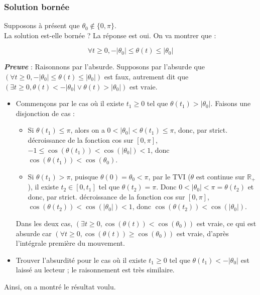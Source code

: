 \documentclass[9pt,a4paper]{article}
\begin{document}
\subsubsection{Solution bornée}
Supposons à présent que $\theta_0 \notin \{0, \pi\}$.\\
La solution est-elle bornée ? La réponse est oui. On va montrer que :
\begin{tcolorbox}[colback=green!5!white, colframe=green!50!black]
    $$
    \forall t \geq 0, -|\theta_0| \leq \theta(t) \leq |\theta_0|
    $$
\end{tcolorbox}
\textbf{\textit{Preuve}} : Raisonnons par l'absurde. Supposons par l'absurde que $(\forall t \geq 0, -|\theta_0| \leq \theta(t) \leq |\theta_0|)$ est faux, autrement dit que $(\exists t \geq 0, \theta(t) < -|\theta_0| \lor \theta(t) > |\theta_0|)$ est vraie.\\
\begin{itemize}[label=\textbullet]
    \item Commençons par le cas où il existe $t_1 \geq 0$ tel que $\theta(t_1) > |\theta_0|$. Faisons une disjonction de cas :
    \begin{itemize}[label=\textbullet]
        \item Si $\theta(t_1) \leq \pi$, alors on a $0 < |\theta_0| < \theta(t_1) \leq \pi$, donc, par strict. décroissance de la fonction cos sur $[0, \pi]$, $-1 \leq \cos(\theta(t_1)) < \cos(|\theta_0|) < 1$, donc $\cos(\theta(t_1)) < \cos(\theta_0)$.
        \item Si $\theta(t_1) > \pi$, puisque $\theta(0) = \theta_0 < \pi$, par le TVI ($\theta$ est continue sur $\mathbb{R}_+$), il existe $t_2 \in [0, t_1]$ tel que $\theta(t_2) = \pi$. Donc $0 < |\theta_0| < \pi = \theta(t_2)$ et donc, par strict. décroissance de la fonction cos sur $[0, \pi]$, $\cos(\theta(t_2)) < \cos(|\theta_0|) < 1$, donc $\cos(\theta(t_2)) < \cos(|\theta_0|)$.
    \end{itemize}
    Dans les deux cas, $(\exists t \geq 0, \cos(\theta(t)) < \cos(\theta_0))$ est vraie, ce qui est absurde car $(\forall t \geq 0, \cos(\theta(t)) \geq \cos(\theta_0))$ est vraie, d'après l'intégrale première du mouvement.
    \item Trouver l'absurdité pour le cas où il existe $t_1 \geq 0$ tel que $\theta(t_1) < -|\theta_0|$ est laissé au lecteur ; le raisonnement est très similaire.
\end{itemize}
Ainsi, on a montré le résultat voulu.
\end{document}

